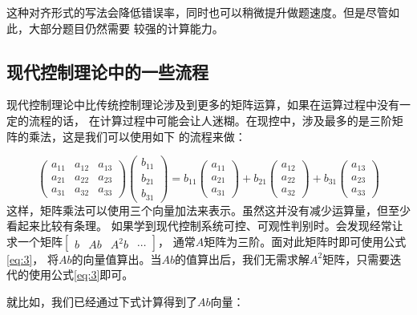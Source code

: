 \documentclass{ctexart}
\begin{document}
这种对齐形式的写法会降低错误率，同时也可以稍微提升做题速度。但是尽管如此，大部分题目仍然需要
较强的计算能力。

\subsection*{现代控制理论中的一些流程}

现代控制理论中比传统控制理论涉及到更多的矩阵运算，如果在运算过程中没有一定的流程的话，
在计算过程中可能会让人迷糊。在现控中，涉及最多的是三阶矩阵的乘法，这是我们可以使用如下
的流程来做：

\begin{equation}
    \begin{pmatrix}
        a_{11} & a_{12} & a_{13} \\
        a_{21} & a_{22} & a_{23} \\
        a_{31} & a_{32} & a_{33}
    \end{pmatrix}
    \begin{pmatrix}
        b_{11} \\
        b_{21} \\
        b_{31}
    \end{pmatrix}
    =
    b_{11}
    \begin{pmatrix}
        a_{11} \\
        a_{21} \\
        a_{31}
    \end{pmatrix}
    +
    b_{21}
    \begin{pmatrix}
        a_{12} \\
        a_{22} \\
        a_{32}
    \end{pmatrix}
    +
    b_{31}
    \begin{pmatrix}
        a_{13} \\
        a_{23} \\
        a_{33}
    \end{pmatrix}
    \label{eq:3}
\end{equation}
这样，矩阵乘法可以使用三个向量加法来表示。虽然这并没有减少运算量，但至少看起来比较有条理。
如果学到现代控制系统可控、可观性判别时。会发现经常让求一个矩阵$\begin{bmatrix}
        b & Ab & A^2b & \cdots
    \end{bmatrix}$，
通常$A$矩阵为三阶。面对此矩阵时即可使用公式\eqref{eq:3}，
将$Ab$的向量值算出。当$Ab$的值算出后，我们无需求解$A^2$矩阵，只需要迭代的使用公式\eqref{eq:3}即可。

就比如，我们已经通过下式计算得到了$Ab$向量：
\end{document}
